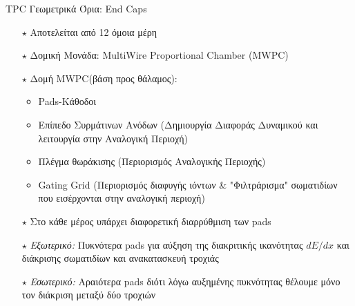 \documentclass[18pt,notheorems,hyperref={pdfauthor=whatever}]{beamer}
\begin{document}
\begin{frame}{TPC Γεωμετρικά Όρια: End Caps}
    
        \begin{itemize}
            \item[$\star$] Αποτελείται από 12 όμοια μέρη 
            \item[$\star$] Δομική Μονάδα: MultiWire Proportional Chamber (MWPC)
            \item[$\star$] Δομή MWPC(βάση προς θάλαμος):
                \begin{itemize}
                      \item  Pads-Κάθοδοι \pause   %
                      \item  Επίπεδο Συρμάτινων Ανόδων (Δημιουργία Διαφοράς Δυναμικού και λειτουργία στην Αναλογική Περιοχή) \pause%
                      \item  Πλέγμα θωράκισης (Περιορισμός Αναλογικής Περιοχής) \pause%
                      \item  Gating Grid (Περιορισμός διαφυγής ιόντων \& "Φιλτράρισμα" σωματιδίων που εισέρχονται στην αναλογική περιοχή)\pause
                \end{itemize}
            \item[$\star$] Στο κάθε μέρος υπάρχει διαφορετική διαρρύθμιση των pads
            \item[$\star$] \textit{Εξωτερικό:} Πυκνότερα pads για αύξηση της διακριτικής ικανότητας $dE/dx$ και διάκρισης σωματιδίων και ανακατασκευή τροχιάς
            \item[$\star$] \textit{Εσωτερικό:} Αραιότερα pads διότι λόγω αυξημένης πυκνότητας θέλουμε μόνο τον διάκριση μεταξύ δύο τροχιών
        \end{itemize}
    
\end{frame}
\end{document}
